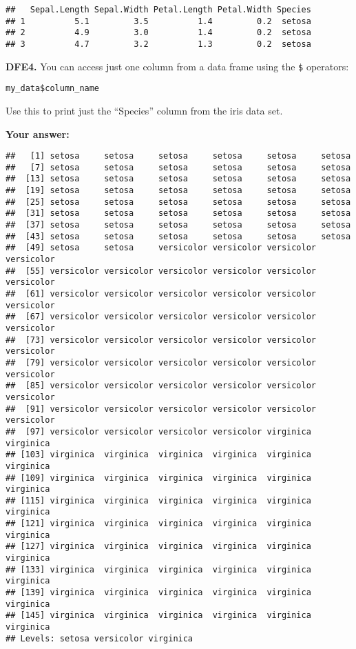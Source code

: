 \documentclass[
]{article}
\newenvironment{Shaded}{\begin{snugshade}}{\end{snugshade}}
\newcommand{\NormalTok}[1]{#1}
\newcommand{\SpecialCharTok}[1]{\textcolor[rgb]{0.00,0.00,0.00}{#1}}
\begin{document}
\begin{verbatim}
##   Sepal.Length Sepal.Width Petal.Length Petal.Width Species
## 1          5.1         3.5          1.4         0.2  setosa
## 2          4.9         3.0          1.4         0.2  setosa
## 3          4.7         3.2          1.3         0.2  setosa
\end{verbatim}

\textbf{DFE4.} You can access just one column from a data frame using
the \texttt{\$} operators:

\texttt{my\_data\$column\_name}

Use this to print just the ``Species'' column from the iris data set.

\textbf{Your answer:}

\begin{Shaded}
\end{Shaded}

\begin{verbatim}
##   [1] setosa     setosa     setosa     setosa     setosa     setosa    
##   [7] setosa     setosa     setosa     setosa     setosa     setosa    
##  [13] setosa     setosa     setosa     setosa     setosa     setosa    
##  [19] setosa     setosa     setosa     setosa     setosa     setosa    
##  [25] setosa     setosa     setosa     setosa     setosa     setosa    
##  [31] setosa     setosa     setosa     setosa     setosa     setosa    
##  [37] setosa     setosa     setosa     setosa     setosa     setosa    
##  [43] setosa     setosa     setosa     setosa     setosa     setosa    
##  [49] setosa     setosa     versicolor versicolor versicolor versicolor
##  [55] versicolor versicolor versicolor versicolor versicolor versicolor
##  [61] versicolor versicolor versicolor versicolor versicolor versicolor
##  [67] versicolor versicolor versicolor versicolor versicolor versicolor
##  [73] versicolor versicolor versicolor versicolor versicolor versicolor
##  [79] versicolor versicolor versicolor versicolor versicolor versicolor
##  [85] versicolor versicolor versicolor versicolor versicolor versicolor
##  [91] versicolor versicolor versicolor versicolor versicolor versicolor
##  [97] versicolor versicolor versicolor versicolor virginica  virginica 
## [103] virginica  virginica  virginica  virginica  virginica  virginica 
## [109] virginica  virginica  virginica  virginica  virginica  virginica 
## [115] virginica  virginica  virginica  virginica  virginica  virginica 
## [121] virginica  virginica  virginica  virginica  virginica  virginica 
## [127] virginica  virginica  virginica  virginica  virginica  virginica 
## [133] virginica  virginica  virginica  virginica  virginica  virginica 
## [139] virginica  virginica  virginica  virginica  virginica  virginica 
## [145] virginica  virginica  virginica  virginica  virginica  virginica 
## Levels: setosa versicolor virginica
\end{verbatim}
\end{document}
